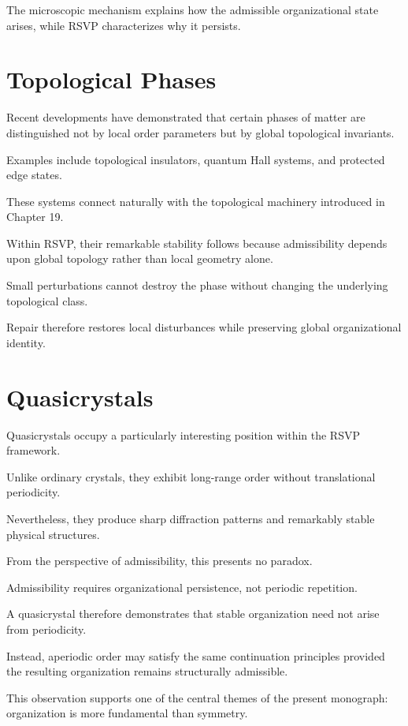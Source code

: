 \documentclass[11pt,oneside]{book}
\numberwithin{equation}{chapter}
\theoremstyle{definition}
\theoremstyle{plain}
\begin{document}
The microscopic mechanism explains how the admissible organizational state
arises, while RSVP characterizes why it persists.

\section{Topological Phases}

Recent developments have demonstrated that certain phases of matter are
distinguished not by local order parameters but by global topological
invariants.

Examples include topological insulators, quantum Hall systems, and
protected edge states.

These systems connect naturally with the topological machinery introduced
in Chapter 19.

Within RSVP, their remarkable stability follows because admissibility
depends upon global topology rather than local geometry alone.

Small perturbations cannot destroy the phase without changing the underlying
topological class.

Repair therefore restores local disturbances while preserving global
organizational identity.

\section{Quasicrystals}

Quasicrystals occupy a particularly interesting position within the RSVP
framework.

Unlike ordinary crystals, they exhibit long-range order without
translational periodicity.

Nevertheless, they produce sharp diffraction patterns and remarkably stable
physical structures.

From the perspective of admissibility, this presents no paradox.

Admissibility requires organizational persistence, not periodic repetition.

A quasicrystal therefore demonstrates that stable organization need not
arise from periodicity.

Instead, aperiodic order may satisfy the same continuation principles
provided the resulting organization remains structurally admissible.

This observation supports one of the central themes of the present
monograph: organization is more fundamental than symmetry.
\end{document}
